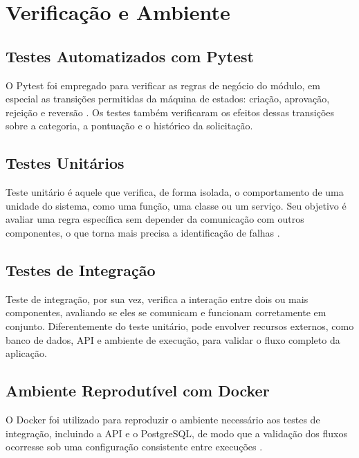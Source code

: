 \section{Verificação e Ambiente}
\label{sec:verificacao-ambiente}

\subsection{Testes Automatizados com Pytest}
\label{subsec:testes-automatizados-pytest}



O Pytest foi empregado para verificar as regras de negócio do módulo, em especial as transições
permitidas da máquina de estados: criação, aprovação, rejeição e reversão \cite{pytest2024}.
Os testes também verificaram os efeitos dessas transições sobre a categoria, a pontuação e o
histórico da solicitação.


\subsection{Testes Unitários}
\label{subsec:testes-unitarios}
Teste unitário é aquele que verifica, de forma isolada, o comportamento de uma
unidade do sistema, como uma função, uma classe ou um serviço. Seu objetivo é
avaliar uma regra específica sem depender da comunicação com outros
componentes, o que torna mais precisa a identificação de falhas \cite{pytest2024}.

\subsection{Testes de Integração}
\label{subsec:testes-integracao}
Teste de integração, por sua vez, verifica a interação entre dois ou mais
componentes, avaliando se eles se comunicam e funcionam corretamente em
conjunto. Diferentemente do teste unitário, pode envolver recursos externos,
como banco de dados, API e ambiente de execução, para validar o fluxo completo
da aplicação.

\subsection{Ambiente Reprodutível com Docker}
\label{subsec:ambiente-reprodutivel-docker}

O Docker foi utilizado para reproduzir o ambiente necessário aos testes de integração, incluindo
a API e o PostgreSQL, de modo que a validação dos fluxos ocorresse sob uma configuração
consistente entre execuções \cite{docker2024}.

